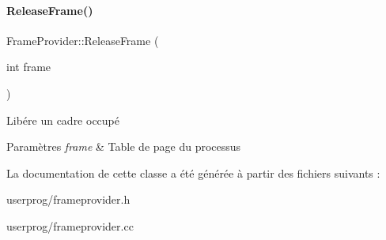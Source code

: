 \paragraph{\texorpdfstring{Release\+Frame()}{ReleaseFrame()}}
{\footnotesize\ttfamily Frame\+Provider\+::\+Release\+Frame (\begin{DoxyParamCaption}\item[{int}]{frame }\end{DoxyParamCaption})}



Libére un cadre occupé 


\begin{DoxyParams}{Paramètres}
{\em frame} & Table de page du processus \\
\hline
\end{DoxyParams}


La documentation de cette classe a été générée à partir des fichiers suivants \+:\begin{DoxyCompactItemize}
\item 
userprog/frameprovider.\+h\item 
userprog/frameprovider.\+cc\end{DoxyCompactItemize}
